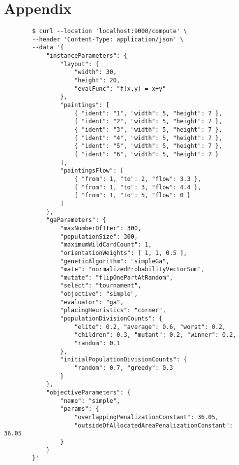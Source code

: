 \chapter{Appendix}\label{ch:appendix}

\begin{listing}[h!]
    \centering
    \begin{verbatim}
        $ curl --location 'localhost:9000/compute' \
        --header 'Content-Type: application/json' \
        --data '{
            "instanceParameters": {
                "layout": {
                    "width": 30,
                    "height": 20,
                    "evalFunc": "f(x,y) = x+y"
                },
                "paintings": [
                    { "ident": "1", "width": 5, "height": 7 },
                    { "ident": "2", "width": 5, "height": 7 },
                    { "ident": "3", "width": 5, "height": 7 },
                    { "ident": "4", "width": 5, "height": 7 },
                    { "ident": "5", "width": 5, "height": 7 },
                    { "ident": "6", "width": 5, "height": 7 }
                ],
                "paintingsFlow": [
                    { "from": 1, "to": 2, "flow": 3.3 },
                    { "from": 1, "to": 3, "flow": 4.4 },
                    { "from": 1, "to": 5, "flow": 0 }
                ]
            },
            "gaParameters": {
                "maxNumberOfIter": 300,
                "populationSize": 300,
                "maximumWildCardCount": 1,
                "orientationWeights": [ 1, 1, 0.5 ],
                "geneticAlgorithm": "simpleGa",
                "mate": "normalizedProbabilityVectorSum",
                "mutate": "flipOnePartAtRandom",
                "select": "tournament",
                "objective": "simple",
                "evaluator": "ga",
                "placingHeuristics": "corner",
                "populationDivisionCounts": {
                    "elite": 0.2, "average": 0.6, "worst": 0.2,
                    "children": 0.3, "mutant": 0.2, "winner": 0.2,
                    "random": 0.1
                },
                "initialPopulationDivisionCounts": {
                    "random": 0.7, "greedy": 0.3
                }
            },
            "objectiveParameters": {
                "name": "simple",
                "params": {
                    "overlappingPenalizationConstant": 36.05,
                    "outsideOfAllocatedAreaPenalizationConstant": 36.05
                }
            }
        }'
    \end{verbatim}
    \cprotect\caption[Example of computation submission without instance name]
    {Example of computation submission using \verb|curl|\footnote{\url{https://curl.se/}} without specifying the instance name.
    Without it, everything has to be entered manually into the request – layout width and height, paintings together with their flow, and evaluation function.
    }

    \label{lst:computation-submission-manual}
\end{listing}


